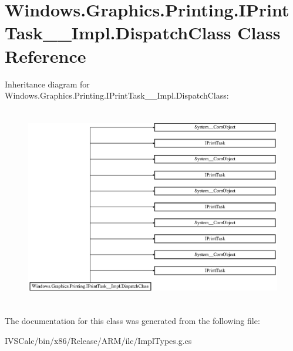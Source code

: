 \hypertarget{class_windows_1_1_graphics_1_1_printing_1_1_i_print_task_____impl_1_1_dispatch_class}{}\section{Windows.\+Graphics.\+Printing.\+I\+Print\+Task\+\_\+\+\_\+\+Impl.\+Dispatch\+Class Class Reference}
\label{class_windows_1_1_graphics_1_1_printing_1_1_i_print_task_____impl_1_1_dispatch_class}
Inheritance diagram for Windows.\+Graphics.\+Printing.\+I\+Print\+Task\+\_\+\+\_\+\+Impl.\+Dispatch\+Class\+:\begin{figure}[H]
\begin{center}
\leavevmode
\includegraphics[height=8.774929cm]{class_windows_1_1_graphics_1_1_printing_1_1_i_print_task_____impl_1_1_dispatch_class}
\end{center}
\end{figure}


The documentation for this class was generated from the following file\+:\begin{DoxyCompactItemize}
\item 
I\+V\+S\+Calc/bin/x86/\+Release/\+A\+R\+M/ilc/Impl\+Types.\+g.\+cs\end{DoxyCompactItemize}
